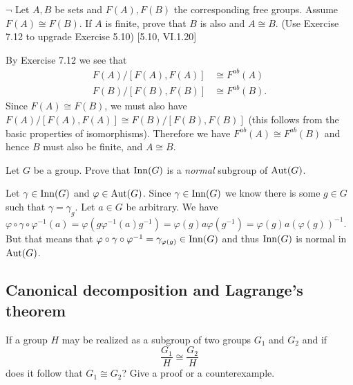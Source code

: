 \begin{problem}
	$\neg$ Let $A, B$ be sets and $F(A), F(B)$ the corresponding free groups. Assume $F(A) \cong F(B)$. If $A$ is finite, prove that $B$ is also and $A \cong B$. (Use Exercise 7.12 to upgrade Exercise 5.10) [5.10, VI.1.20]
\end{problem}

\begin{solution}
	By Exercise 7.12 we see that
	\begin{equation*}
		\begin{aligned}
			F(A)/[F(A), F(A)] &\cong F^{ab}(A) \\
			F(B)/[F(B), F(B)] &\cong F^{ab}(B) \text{.}
		\end{aligned}
	\end{equation*}
	Since $F(A) \cong F(B)$, we must also have $F(A)/[F(A), F(A)] \cong F(B)/[F(B), F(B)]$ (this follows from the basic properties of isomorphisms). Therefore we have $F^{ab}(A) \cong F^{ab}(B)$ and hence $B$ must also be finite, and $A \cong B$.
\end{solution}

\begin{problem}
	Let $G$ be a group. Prove that $\mathrm{Inn}(G)$ is a \emph{normal} subgroup of $\mathrm{Aut}(G)$.
\end{problem}

\begin{solution}
	Let $\gamma \in \mathrm{Inn}(G)$ and $\varphi \in \mathrm{Aut}(G)$. Since $\gamma \in \mathrm{Inn}(G)$ we know there is some $g \in G$ such that $\gamma = \gamma_g$. Let $a \in G$ be arbitrary. We have $\varphi \circ \gamma \circ \varphi^{-1}(a) = \varphi(g \varphi^{-1}(a) g^{-1}) = \varphi(g) a \varphi(g^{-1}) = \varphi(g) a (\varphi(g))^{-1}$. But that means that $\varphi \circ \gamma \circ \varphi^{-1} = \gamma_{\varphi(g)} \in \mathrm{Inn}(G)$ and thus $\mathrm{Inn}(G)$ is normal in $\mathrm{Aut}(G)$.
\end{solution}

\subsection{Canonical decomposition and Lagrange's theorem}

\begin{problem}
	If a group $H$ may be realized as a subgroup of two groups $G_1$ and $G_2$ and if
	\[
		\frac{G_1}{H} \cong \frac{G_2}{H}
	\]
	does it follow that $G_1 \cong G_2$? Give a proof or a counterexample.
\end{problem}

